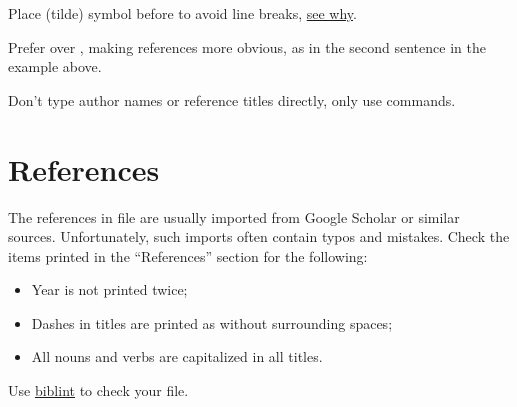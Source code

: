 \documentclass[12pt,nonacm,natbib=false]{acmart}
\begin{document}
Place \ff{\~} (tilde) symbol before  to avoid line breaks, \href{https://tex.stackexchange.com/questions/41264/what-is-the-difference-in-citing-referencing-with-or-without-tilde}{see why}.

Prefer  over , making references more obvious, as in the second sentence in the example above.

Don't type author names or reference titles directly, only use  commands.

\section{References}

The references in  file are usually imported from Google Scholar or similar sources. Unfortunately, such imports often contain typos and mistakes. Check the items printed in the ``References'' section for the following:

\begin{itemize}
    \item Year is not printed twice;
    \item Dashes in titles are printed as \ff{-{}-{}-} without surrounding spaces;
    \item All nouns and verbs are capitalized in all titles.
\end{itemize}

Use \href{https://github.com/Kingsford-Group/biblint}{biblint} to check your  file.
\end{document}
